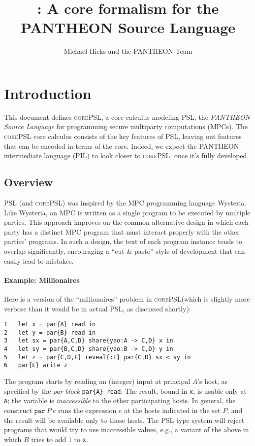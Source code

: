 \documentclass[10pt]{article}
\title{\lang: A core formalism for the PANTHEON Source Language}
\author{Michael Hicks and the PANTHEON Team}
\newcommand{\kw}[1]{\ensuremath{\mathtt{#1}}}
\newcommand{\epar}[2]{\ensuremath{\kw{par}~{#1}~{#2}}}
\newcommand{\lang}{\textsc{corePSL}\xspace}
\begin{document}
\maketitle

\section{Introduction}

This document defines \lang, a core calculus modeling PSL, the
\emph{PANTHEON Source Language} for programming secure multiparty
computations (MPCs). The \lang core calculus consists of the key features of PSL,
leaving out features that can be encoded in terms of the core. Indeed,
we expect the PANTHEON intermediate language (PIL) to look closer to
\lang, once it's fully developed.

\subsection{Overview}
\label{sec:overview}

PSL (and \lang) was inspired by the MPC programming language
Wysteria. Like Wysteria, an MPC is written as a single program to be
executed by multiple parties. This approach improves on the common
alternative design in which each party has a distinct MPC
program that must interact properly with the other parties'
programs. In such a design, the text of each program instance tends to
overlap significantly, encouraging a ``cut \& paste'' style of
development that can easily lead to mistakes.

\paragraph{Example: Millionaires}

Here is a version of the ``millionaires'' problem in \lang (which is
slightly more verbose than it would be in actual PSL, as discussed shortly):
\begin{verbatim}
1   let x = par{A} read in
2   let y = par{B} read in
3   let sx = par{A,C,D} share{yao:A -> C,D} x in
4   let sy = par{B,C,D} share{yao:B -> C,D} y in
5   let z = par{C,D,E} reveal{:E} par{C,D} sx < sy in
6   par{E} write z
\end{verbatim}
The program starts by reading an (integer) input at principal $A$'s
host, as specified by the \emph{par block} \texttt{par\{A\} read}. The
result, bound in \texttt{x}, is usable only at \texttt{A}; the
variable is \emph{inaccessible} to the other participating hosts. In
general, the construct $\epar{P}{e}$ runs the expression $e$ at the
hosts indicated in the set $P$, and the result will be available only
to those hosts. The PSL type system will reject programs that would
try to use inaccessible values, e.g., a variant of the above in
which $B$ tries to add $1$ to \texttt{x}.
\end{document}
